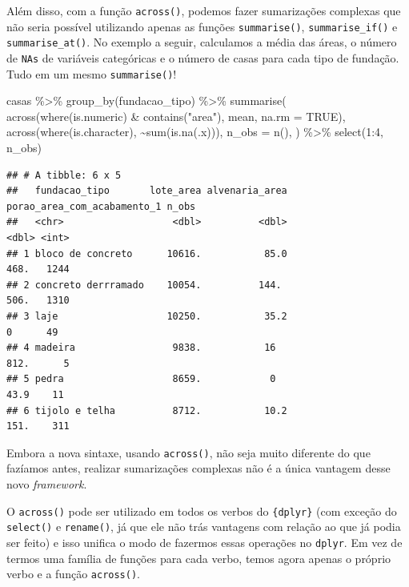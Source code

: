 \documentclass[
]{book}
\newenvironment{Shaded}{\begin{snugshade}}{\end{snugshade}}
\newcommand{\AttributeTok}[1]{\textcolor[rgb]{0.77,0.63,0.00}{#1}}
\newcommand{\ConstantTok}[1]{\textcolor[rgb]{0.00,0.00,0.00}{#1}}
\newcommand{\DecValTok}[1]{\textcolor[rgb]{0.00,0.00,0.81}{#1}}
\newcommand{\FunctionTok}[1]{\textcolor[rgb]{0.00,0.00,0.00}{#1}}
\newcommand{\NormalTok}[1]{#1}
\newcommand{\SpecialCharTok}[1]{\textcolor[rgb]{0.00,0.00,0.00}{#1}}
\newcommand{\StringTok}[1]{\textcolor[rgb]{0.31,0.60,0.02}{#1}}
\begin{document}
Além disso, com a função \texttt{across()}, podemos fazer sumarizações complexas que não seria possível utilizando apenas as funções \texttt{summarise()}, \texttt{summarise\_if()} e \texttt{summarise\_at()}. No exemplo a seguir, calculamos a média das áreas, o número de \texttt{NAs} de variáveis categóricas e o número de casas para cada tipo de fundação. Tudo em um mesmo \texttt{summarise()}!

\begin{Shaded}
\begin{Highlighting}[]
\NormalTok{casas }\SpecialCharTok{\%\textgreater{}\%}
  \FunctionTok{group\_by}\NormalTok{(fundacao\_tipo) }\SpecialCharTok{\%\textgreater{}\%}
  \FunctionTok{summarise}\NormalTok{(}
    \FunctionTok{across}\NormalTok{(}\FunctionTok{where}\NormalTok{(is.numeric) }\SpecialCharTok{\&} \FunctionTok{contains}\NormalTok{(}\StringTok{"area"}\NormalTok{), mean, }\AttributeTok{na.rm =} \ConstantTok{TRUE}\NormalTok{),}
    \FunctionTok{across}\NormalTok{(}\FunctionTok{where}\NormalTok{(is.character), }\SpecialCharTok{\textasciitilde{}}\FunctionTok{sum}\NormalTok{(}\FunctionTok{is.na}\NormalTok{(.x))),}
    \AttributeTok{n\_obs =} \FunctionTok{n}\NormalTok{(),}
\NormalTok{  ) }\SpecialCharTok{\%\textgreater{}\%} 
  \FunctionTok{select}\NormalTok{(}\DecValTok{1}\SpecialCharTok{:}\DecValTok{4}\NormalTok{, n\_obs)}
\end{Highlighting}
\end{Shaded}

\begin{verbatim}
## # A tibble: 6 x 5
##   fundacao_tipo       lote_area alvenaria_area porao_area_com_acabamento_1 n_obs
##   <chr>                   <dbl>          <dbl>                       <dbl> <int>
## 1 bloco de concreto      10616.           85.0                       468.   1244
## 2 concreto derrramado    10054.          144.                        506.   1310
## 3 laje                   10250.           35.2                         0      49
## 4 madeira                 9838.           16                         812.      5
## 5 pedra                   8659.            0                          43.9    11
## 6 tijolo e telha          8712.           10.2                       151.    311
\end{verbatim}

Embora a nova sintaxe, usando \texttt{across()}, não seja muito diferente do que fazíamos antes, realizar sumarizações complexas não é a única vantagem desse novo \emph{framework}.

O \texttt{across()} pode ser utilizado em todos os verbos do \texttt{\{dplyr\}} (com exceção do \texttt{select()} e \texttt{rename()}, já que ele não trás vantagens com relação ao que já podia ser feito) e isso unifica o modo de fazermos essas operações no \texttt{dplyr}. Em vez de termos uma família de funções para cada verbo, temos agora apenas o próprio verbo e a função \texttt{across()}.
\end{document}
